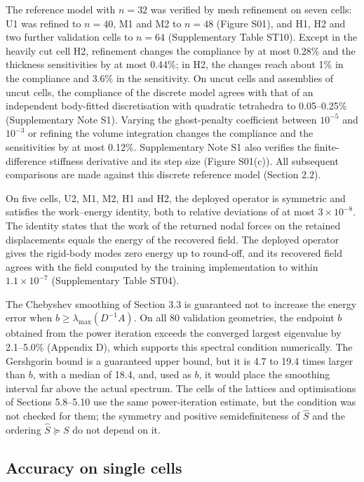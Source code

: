 \documentclass[preprint,12pt,authoryear]{elsarticle}
\begin{document}
The reference model with \(n=32\) was verified by mesh refinement on seven cells: U1 was refined to \(n=40\), M1 and M2 to \(n=48\) (Figure S01), and H1, H2 and two further validation cells to \(n=64\) (Supplementary Table ST10). Except in the heavily cut cell H2, refinement changes the compliance by at most 0.28\% and the thickness sensitivities by at most 0.44\%; in H2, the changes reach about 1\% in the compliance and 3.6\% in the sensitivity. On uncut cells and assemblies of uncut cells, the compliance of the discrete model agrees with that of an independent body-fitted discretisation with quadratic tetrahedra to 0.05--0.25\% (Supplementary Note S1). Varying the ghost-penalty coefficient between \(10^{-5}\) and \(10^{-3}\) or refining the volume integration changes the compliance and the sensitivities by at most 0.12\%. Supplementary Note S1 also verifies the finite-difference stiffness derivative and its step size (Figure S01(c)). All subsequent comparisons are made against this discrete reference model (Section 2.2).

On five cells, U2, M1, M2, H1 and H2, the deployed operator is symmetric and satisfies the work--energy identity, both to relative deviations of at most \(3\times10^{-8}\). The identity states that the work of the returned nodal forces on the retained displacements equals the energy of the recovered field. The deployed operator gives the rigid-body modes zero energy up to round-off, and its recovered field agrees with the field computed by the training implementation to within \(1.1\times10^{-7}\) (Supplementary Table ST04).

The Chebyshev smoothing of Section 3.3 is guaranteed not to increase the energy error when \(b\ge\lambda_{\max}(D^{-1}A)\). On all 80 validation geometries, the endpoint \(b\) obtained from the power iteration exceeds the converged largest eigenvalue by 2.1--5.0\% (Appendix D), which supports this spectral condition numerically. The Gershgorin bound is a guaranteed upper bound, but it is 4.7 to 19.4 times larger than \(b\), with a median of 18.4, and, used as \(b\), it would place the smoothing interval far above the actual spectrum. The cells of the lattices and optimisations of Sections 5.8--5.10 use the same power-iteration estimate, but the condition was not checked for them; the symmetry and positive semidefiniteness of \(\widehat S\) and the ordering \(\widehat S\succeq S\) do not depend on it.

\subsection{Accuracy on single cells}
\end{document}

